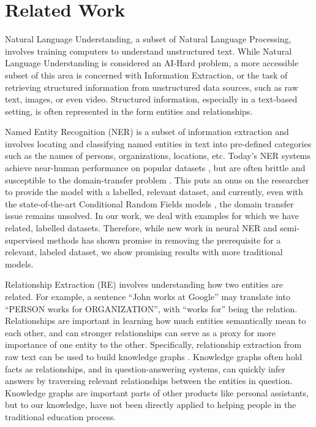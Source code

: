 \documentclass[11pt,a4paper]{article}
\begin{document}
\section{Related Work}
Natural Language Understanding, a subset of Natural Language Processing, involves training computers to understand unstructured text. While Natural Language Understanding is considered an AI-Hard problem, a more accessible subset of this area is concerned with Information Extraction, or the task of retrieving structured information from unstructured data sources, such as raw text, images, or even video. Structured information, especially in a text-based setting, is often represented in the form entities and relationships. 

Named Entity Recognition (NER) is a subset of information extraction and involves locating and classifying named entities in text into pre-defined categories such as the names of persons, organizations, locations, etc. Today’s NER systems achieve near-human performance on popular datasets \cite{M98-1002}, but are often brittle and susceptible to the domain-transfer problem \cite{Poibeau01propername}. This puts an onus on the researcher to provide the model with a labelled, relevant dataset, and currently, even with the state-of-the-art Conditional Random Fields models \cite{Finkel:2005:INI:1219840.1219885}, the domain transfer issue remains unsolved. In our work, we deal with examples for which we have related, labelled datasets. Therefore, while new work in neural NER and semi-supervised methods \cite{Turian:2010:WRS:1858681.1858721} \cite{Lin:2009:PCD:1690219.1690290} has shown promise in removing the prerequisite for a relevant, labeled dataset, we show promising results with more traditional models.

Relationship Extraction (RE) involves understanding how two entities are related. For example, a sentence “John works at Google” may translate into “PERSON works for ORGANIZATION”, with “works for” being the relation. Relationships are important in learning how much entities semantically mean to each other, and can stronger relationships can serve as a proxy for more importance of one entity to the other. Specifically, relationship extraction from raw text can be used to build knowledge graphs \cite{Ramakrishnan:2006:FSR:2127045.2127088}. Knowledge graphs often hold facts as relationships, and in question-answering systems, can quickly infer answers by traversing relevant relationships between the entities in question. Knowledge graphs are important parts of other products like personal assistants, but to our knowledge, have not been directly applied to helping people in the traditional education process.
\end{document}
